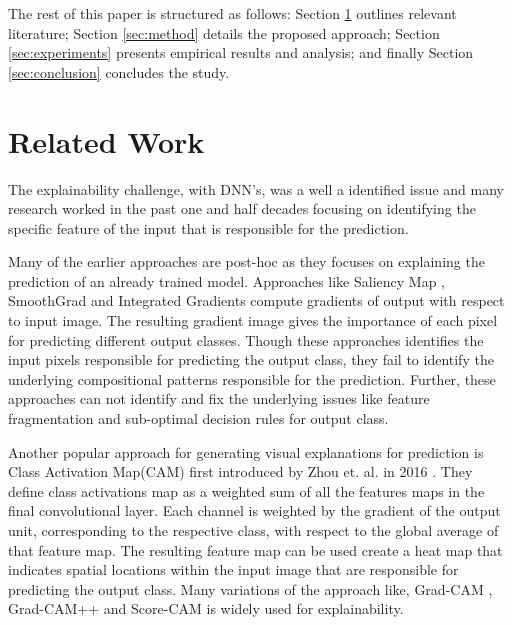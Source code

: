 \documentclass[pdflatex,referee,lineno]{sn-jnl}
\theoremstyle{thmstyleone}
\theoremstyle{thmstyletwo}
\theoremstyle{thmstylethree}
\begin{document}
The rest of this paper is structured as follows: Section \ref{sec:related} outlines relevant literature; Section \ref{sec:method} details the proposed approach; Section \ref{sec:experiments} presents empirical results and analysis; and finally Section \ref{sec:conclusion} concludes the study.

\section{Related Work}\label{sec:related}
The explainability challenge, with DNN's, was a well a identified issue and many research worked in the past one and half decades focusing on  identifying the specific feature of the input that is responsible for the prediction. 

Many of the earlier approaches are post-hoc as they focuses on explaining the prediction of an already trained model.
Approaches like Saliency Map \cite{simonyan2013deep}, SmoothGrad \cite{smilkov2017smoothgrad} and  Integrated Gradients \cite{sundararajan2017axiomatic} compute gradients of output with respect to input image. The resulting gradient image gives the importance of each pixel  for predicting different  output classes. Though these approaches identifies the input pixels responsible for predicting the output class, they  fail to identify the underlying compositional patterns responsible for the prediction. Further, these approaches can not identify and fix the underlying issues like feature fragmentation and sub-optimal decision rules for output class.

Another popular approach for generating visual explanations for prediction is Class Activation Map(CAM) first introduced by Zhou et. al. in 2016 \cite{zhou2016cam}.  They define class activations map  as a weighted sum of   all the features maps in the final convolutional layer.  Each channel is weighted by the gradient of the output unit, corresponding to  the respective class, with respect to the global average of that feature map.  The resulting feature map can be used create a heat map that  indicates  spatial locations within the  input image that are responsible for  predicting the  output class.  Many variations of the approach like, Grad-CAM \cite{selvaraju2017grad}, Grad-CAM++ \cite{chattopadhay2018grad} and Score-CAM \cite{wang2020score}  is widely used for explainability.
\end{document}
